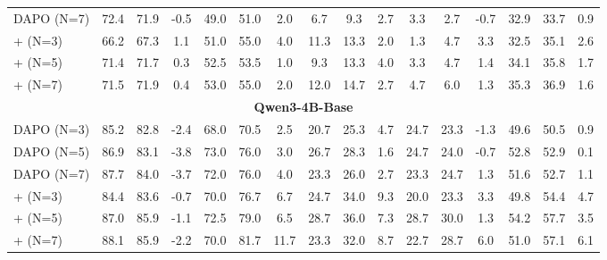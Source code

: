 \begin{table}[!t]
\begin{center}
{\begin{tabular}{lccccccccccccccc}
        DAPO (N=7) & 72.4 & 71.9 & -0.5 & 49.0 & 51.0 & 2.0 & 6.7 & 9.3 & 2.7 & 3.3 & 2.7 & -0.7 & 32.9 & 33.7 & 0.9 \\
        +\SDRL{} (N=3) & 66.2 & 67.3 & 1.1  & 51.0 & 55.0 & 4.0 & 11.3 & 13.3 & 2.0 & 1.3 & 4.7 & 3.3 & 32.5 & 35.1 & 2.6 \\
        +\SDRL{} (N=5) & 71.4 & 71.7 & 0.3  & 52.5 & 53.5 & 1.0  & 9.3 & 13.3 & 4.0  & 3.3 & 4.7 & 1.4  & 34.1 & 35.8 & 1.7 \\
        +\SDRL{} (N=7) & 71.5 & 71.9 & 0.4  & 53.0 & 55.0 & 2.0 & 12.0 & 14.7 & 2.7 & 4.7 & 6.0 & 1.3 & 35.3 & 36.9 & 1.6 \\
        \midrule
        \multicolumn{16}{c}{\textbf{Qwen3-4B-Base}} \\
        \midrule
        DAPO (N=3) & 85.2 & 82.8 & -2.4 & 68.0 & 70.5 & 2.5 & 20.7 & 25.3 & 4.7 & 24.7 & 23.3 & -1.3 & 49.6 & 50.5 & 0.9 \\
        DAPO (N=5)    & 86.9 & 83.1 & -3.8 & 73.0 & 76.0 & 3.0 & 26.7 & 28.3 & 1.6 & 24.7 & 24.0 & -0.7 & 52.8 & 52.9 & 0.1 \\
        DAPO (N=7) & 87.7 & 84.0 & -3.7 & 72.0 & 76.0 & 4.0 & 23.3 & 26.0 & 2.7 & 23.3 & 24.7 & 1.3 & 51.6 & 52.7 & 1.1 \\
        +\SDRL{} (N=3) & 84.4 & 83.6 & -0.7 & 70.0 & 76.7 & 6.7 & 24.7 & 34.0 & 9.3 & 20.0 & 23.3 & 3.3 & 49.8 & 54.4 & 4.7 \\
        +\SDRL{} (N=5)    & 87.0 & 85.9 & -1.1 & 72.5 & 79.0 & 6.5 & 28.7 & 36.0 & 7.3 & 28.7 & 30.0 & 1.3 & 54.2 & 57.7 & 3.5 \\
        +\SDRL{} (N=7) & 88.1 & 85.9 & -2.2 & 70.0 & 81.7 & 11.7 & 23.3 & 32.0 & 8.7 & 22.7 & 28.7 & 6.0 & 51.0 & 57.1 & 6.1 \\
        \bottomrule
      \end{tabular}%
    }
  \end{center}
  \vskip -0.1in
\end{table}


